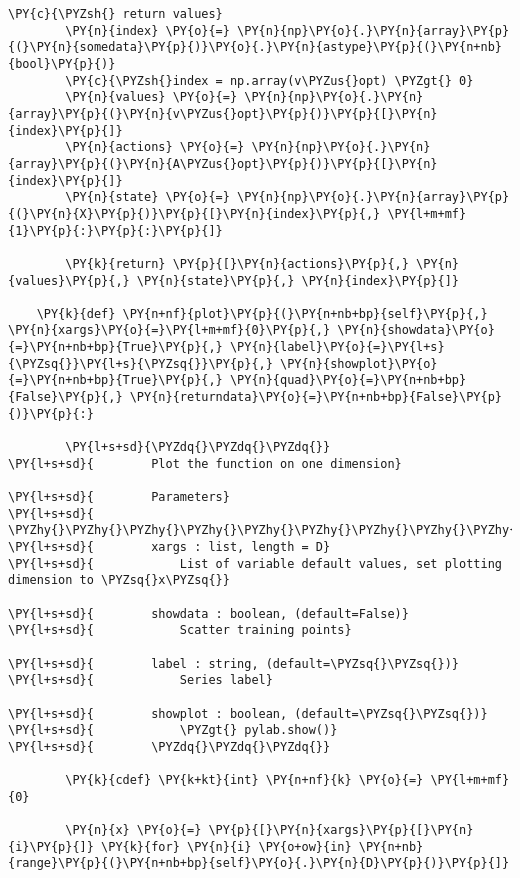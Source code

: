 \begin{Verbatim}[commandchars=\\\{\}]
        \PY{c}{\PYZsh{} return values}
        \PY{n}{index} \PY{o}{=} \PY{n}{np}\PY{o}{.}\PY{n}{array}\PY{p}{(}\PY{n}{somedata}\PY{p}{)}\PY{o}{.}\PY{n}{astype}\PY{p}{(}\PY{n+nb}{bool}\PY{p}{)}
        \PY{c}{\PYZsh{}index = np.array(v\PYZus{}opt) \PYZgt{} 0}
        \PY{n}{values} \PY{o}{=} \PY{n}{np}\PY{o}{.}\PY{n}{array}\PY{p}{(}\PY{n}{v\PYZus{}opt}\PY{p}{)}\PY{p}{[}\PY{n}{index}\PY{p}{]}
        \PY{n}{actions} \PY{o}{=} \PY{n}{np}\PY{o}{.}\PY{n}{array}\PY{p}{(}\PY{n}{A\PYZus{}opt}\PY{p}{)}\PY{p}{[}\PY{n}{index}\PY{p}{]}
        \PY{n}{state} \PY{o}{=} \PY{n}{np}\PY{o}{.}\PY{n}{array}\PY{p}{(}\PY{n}{X}\PY{p}{)}\PY{p}{[}\PY{n}{index}\PY{p}{,} \PY{l+m+mf}{1}\PY{p}{:}\PY{p}{:}\PY{p}{]}

        \PY{k}{return} \PY{p}{[}\PY{n}{actions}\PY{p}{,} \PY{n}{values}\PY{p}{,} \PY{n}{state}\PY{p}{,} \PY{n}{index}\PY{p}{]}

    \PY{k}{def} \PY{n+nf}{plot}\PY{p}{(}\PY{n+nb+bp}{self}\PY{p}{,} \PY{n}{xargs}\PY{o}{=}\PY{l+m+mf}{0}\PY{p}{,} \PY{n}{showdata}\PY{o}{=}\PY{n+nb+bp}{True}\PY{p}{,} \PY{n}{label}\PY{o}{=}\PY{l+s}{\PYZsq{}}\PY{l+s}{\PYZsq{}}\PY{p}{,} \PY{n}{showplot}\PY{o}{=}\PY{n+nb+bp}{True}\PY{p}{,} \PY{n}{quad}\PY{o}{=}\PY{n+nb+bp}{False}\PY{p}{,} \PY{n}{returndata}\PY{o}{=}\PY{n+nb+bp}{False}\PY{p}{)}\PY{p}{:}

        \PY{l+s+sd}{\PYZdq{}\PYZdq{}\PYZdq{}}
\PY{l+s+sd}{        Plot the function on one dimension}

\PY{l+s+sd}{        Parameters}
\PY{l+s+sd}{        \PYZhy{}\PYZhy{}\PYZhy{}\PYZhy{}\PYZhy{}\PYZhy{}\PYZhy{}\PYZhy{}\PYZhy{}\PYZhy{}\PYZhy{}}
\PY{l+s+sd}{        xargs : list, length = D}
\PY{l+s+sd}{            List of variable default values, set plotting dimension to \PYZsq{}x\PYZsq{}}

\PY{l+s+sd}{        showdata : boolean, (default=False)}
\PY{l+s+sd}{            Scatter training points}

\PY{l+s+sd}{        label : string, (default=\PYZsq{}\PYZsq{})}
\PY{l+s+sd}{            Series label}

\PY{l+s+sd}{        showplot : boolean, (default=\PYZsq{}\PYZsq{})}
\PY{l+s+sd}{            \PYZgt{} pylab.show()}
\PY{l+s+sd}{        \PYZdq{}\PYZdq{}\PYZdq{}}

        \PY{k}{cdef} \PY{k+kt}{int} \PY{n+nf}{k} \PY{o}{=} \PY{l+m+mf}{0}
        
        \PY{n}{x} \PY{o}{=} \PY{p}{[}\PY{n}{xargs}\PY{p}{[}\PY{n}{i}\PY{p}{]} \PY{k}{for} \PY{n}{i} \PY{o+ow}{in} \PY{n+nb}{range}\PY{p}{(}\PY{n+nb+bp}{self}\PY{o}{.}\PY{n}{D}\PY{p}{)}\PY{p}{]}


\end{Verbatim}
